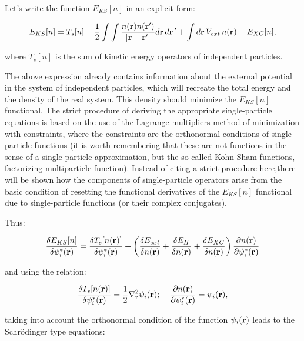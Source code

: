 Let's write the function $E_{KS}[n]$ in an explicit form:

\begin{equation}
    \label{KS15}
    E_{KS}[n]=T_s[n]+\frac{1}{2}\int\int\frac{n(\mathbf{r})n(\mathbf{r}')}{\left|\mathbf{r}-\mathbf{r}'\right|}d\mathbf{r}\,d\mathbf{r}\,'+\int d\mathbf{r}\,V_{ext}\,n(\mathbf{r})+E_{XC}[n],
\end{equation}

where $T_s[n]$ is the sum of kinetic energy operators of independent particles.

The above expression already contains information about the external potential in the system of independent particles, which will recreate the total energy and the density of the real system.
This density should minimize the $E_{KS}[n]$ functional.
The strict procedure of deriving the appropriate single-particle equations is based on the use of the Lagrange multipliers method of minimization with constraints, where the constraints are the orthonormal conditions of single-particle functions (it is worth remembering that these are not functions in the sense of a single-particle approximation, but the so-called Kohn-Sham functions, factorizing multiparticle function).
Instead of citing a strict procedure here,there will be shown how the components of single-particle operators arise from the basic condition of resetting the functional derivatives of the $E_{KS}[n]$ functional due to single-particle functions (or their complex conjugates).

Thus:

\begin{equation}
    \label{Eq:KS_derivative}
    \frac{\delta E_{KS}[n]}{\delta \psi_i^*(\mathbf{r})}=\frac{\delta T_s[n(\mathbf{r})]}{\delta \psi_i^*(\mathbf{r})}+\left(\frac{\delta E_{ext}}{\delta n(\mathbf{r})}+\frac{\delta E_H}{\delta n(\mathbf{r})}+\frac{\delta E_{XC}}{\delta n(\mathbf{r})}\right)\frac{\partial n(\mathbf{r})}{\partial \psi_i^*(\mathbf{r})}
\end{equation}

and using the relation:

\begin{equation}
    \label{Eq:deriv_relations}
    \frac{\delta T_s[n(\mathbf{r})]}{\delta \psi_i^*(\mathbf{r})}=\frac{1}{2}\nabla_\mathbf{r}^2\psi_i(\mathbf{r});\;\;\;\;\frac{\partial n(\mathbf{r})}{\partial \psi_i^*(\mathbf{r})}=\psi_i(\mathbf{r}),
\end{equation}

taking into account the orthonormal condition of the function $\psi_i(\mathbf{r})$ leads to the Schr\"odinger type equations:

